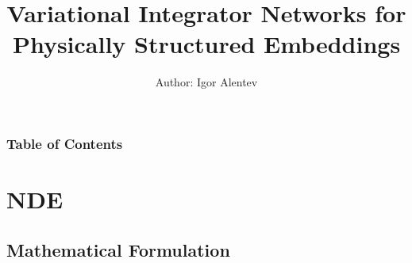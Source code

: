 \documentclass[
    11pt, %
    aspectratio=169, ]{beamer}%
\title[VIN]{Variational Integrator Networks for Physically Structured Embeddings}
\subtitle{}
\author[]{Author: Igor Alentev}
\institute[]{Robotics Track \\ \smallskip \textit{i.alentev@innopolis.university}}
\date[Fall 2023]
\begin{document}
\section{}
\begin{frame}
    \titlepage %

\end{frame}


\begin{frame}
    \frametitle{Table of Contents} %

    \tableofcontents %
\end{frame}


\section{NDE}

\subsection{Mathematical Formulation}
\end{document}
